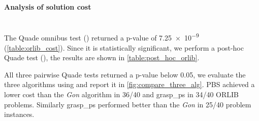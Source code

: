 

\paragraph{Analysis of solution cost}~\\
The Quade omnibus test ()  returned a p-value of \num{7.25e-9} (\cref{table:orlib_cost}). Since it is statistically significant, we perform a post-hoc Quade test (), the results are shown in \cref{table:post_hoc_orlib}.



All three pairwise Quade tests returned a p-value below 0.05, we evaluate the three algorithms using  and report it in \cref{fig:compare_three_alg}. PBS achieved a lower cost than the \emph{Gon} algorithm in 36/40 and \acrshort{grasp_ps} in 34/40 ORLIB problems. Similarly \acrshort{grasp_ps} performed better than the \emph{Gon} in 25/40 problem instances. 

